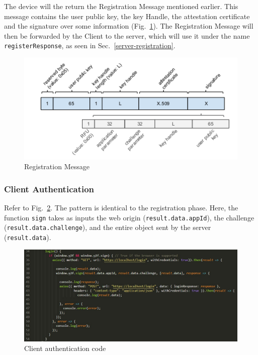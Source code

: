 The device will the return the Registration Message mentioned earlier. This message contains the user public key, the key Handle, the attestation certificate and the signature over some information (Fig.~\ref{fig:registration-message}). The Registration Message will then be forwarded by the Client to the server, which will use it under the name \texttt{registerResponse}, as seen in Sec.~\ref{server-registration}.

\begin{figure}[h]
    \centering
    \includegraphics[width=\linewidth]{resources/registration-message.png}
      \caption{Registration Message}
      \label{fig:registration-message}
\end{figure}

\subsubsection{Client Authentication}\label{client-authentication}
Refer to Fig.~\ref{fig:client-authentication}. The pattern is identical to the registration phase. Here, the function \texttt{sign} takes as inputs the web origin (\texttt{result.data.appId}), the challenge (\texttt{result.data.challenge}), and the entire object sent by the server (\texttt{result.data}).

\begin{figure}[h]
    \centering
    \includegraphics[width=\linewidth]{resources/login-client-code.jpg}
      \caption{Client authentication code}
      \label{fig:client-authentication}
\end{figure}

